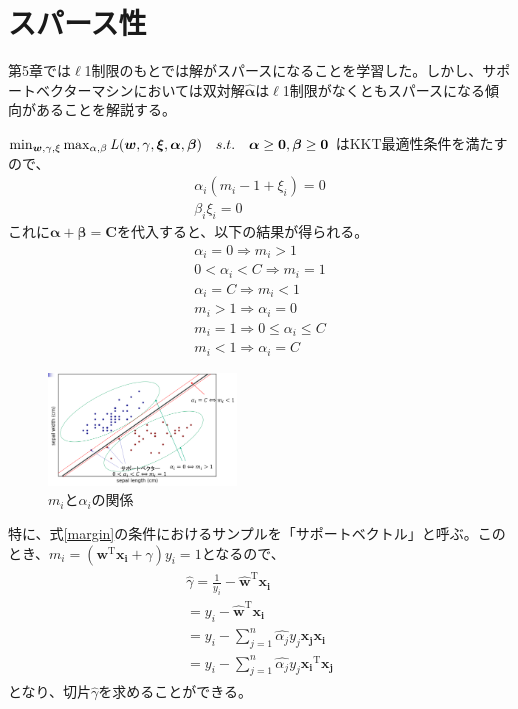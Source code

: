\section{スパース性}
第5章では$\ell$1制限のもとでは解がスパースになることを学習した。しかし、サポートベクターマシンにおいては双対解$\bm{\hat{\alpha}}$は$\ell$1制限がなくともスパースになる傾向があることを解説する。

$\min_{\bm{w}, \gamma, \xi}\max_{\alpha, \beta}{\it{L}}(\bm{w}, \gamma, \bm{\xi}, \bm{\alpha}, \bm{\beta})\text{\ \ \ }s.t.\text{\ \ \ }\bm{\alpha} \ge \bm{0}, \bm{\beta} \ge \bm{0}$
はKKT最適性条件を満たすので、
\begin{eqnarray}
  \alpha_i(m_i - 1 + \xi_i) = 0 \\
  \beta_i\xi_i = 0 
\end{eqnarray}
これに$\bm{\alpha} + \bm{\beta} = \bm{C}$を代入すると、以下の結果が得られる。
\begin{eqnarray}
  \alpha_i = 0 \Longrightarrow m_i > 1 \\
  \label{margin}
  0 < \alpha_i < C \Longrightarrow m_i = 1 \\
  \alpha_i = C \Longrightarrow m_i < 1 \\
  m_i > 1 \Longrightarrow \alpha_i = 0 \\
  m_i = 1 \Longrightarrow 0 \le \alpha_i \le C \\
  m_i < 1 \Longrightarrow \alpha_i = C
\end{eqnarray}

\begin{figure}[h]
  \centering
  \includegraphics[width=5cm]{figure/section3/figure1.png}
  \caption{$m_i$と$\alpha_i$の関係}
\end{figure}

特に、式\ref{margin}の条件におけるサンプルを「サポートベクトル」と呼ぶ。このとき、$m_i = (\bm{w}^{\mathrm{T}}\bm{x_i} + \gamma)y_i = 1$となるので、
\begin{eqnarray}
  \begin{split}
    \hat{\gamma} = \frac{1}{y_i} - \hat{\bm{w}}^{\mathrm{T}}\bm{x_i} \\
    = y_i - \hat{\bm{w}}^{\mathrm{T}}\bm{x_i} \\
    = y_i - \sum_{j=1}^{n}\hat{\alpha_j}y_j\bm{x_j}\bm{x_i} \\
    = y_i - \sum_{j=1}^{n}\hat{\alpha_j}y_j\bm{x_i}^{\mathrm{T}}\bm{x_j}
  \end{split}
\end{eqnarray}
となり、切片$\hat{\gamma}$を求めることができる。


